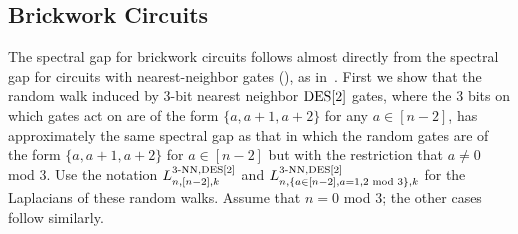 \subsection{Brickwork Circuits}\label{sec:brickwork}
The spectral gap for brickwork circuits follows almost directly from the spectral gap for circuits with nearest-neighbor gates (), as in~\cite{brandao2016local}. First we show that the random walk induced by 3-bit nearest neighbor $\mathrm{DES}[2]$ gates, where the 3 bits on which gates act on are of the form $\{a,a+1,a+2\}$ for any $a\in[n-2]$, has approximately the same spectral gap as that in which the random gates are of the form $\{a,a+1,a+2\}$ for $a\in[n-2]$ but with the restriction that $a\neq 0$ mod 3. Use the notation $L_{n,[n-2],k}^{3\text{-NN},\mathrm{DES}[2]}$ and $L_{n,\{a\in[n-2],a=1,2\text{ mod } 3\},k}^{3\text{-NN},\mathrm{DES}[2]}$ for the Laplacians of these random walks. Assume that $n=0$ mod 3; the other cases follow similarly. 

